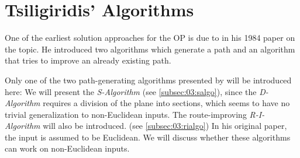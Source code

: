 \section{Tsiligiridis' Algorithms}
\label{sec:03:tsiligiridis}

One of the earliest solution approaches for the OP is due to \citeauthor{tsiligiridis_heuristic_1984} in his 1984 paper on the topic. \cite{tsiligiridis_heuristic_1984}
He introduced two algorithms which generate a path and an algorithm that tries to improve an already existing path.

Only one of the two path-generating algorithms presented by \citeauthor{tsiligiridis_heuristic_1984} will be introduced here:
We will present the \emph{S-Algorithm} (see \cref{subsec:03:salgo}), since the \emph{D-Algorithm} requires a division of the plane into sections, which seems to have no trivial generalization to non-Euclidean inputs.
The route-improving \emph{R-I-Algorithm} will also be introduced. (see \cref{subsec:03:rialgo})
In his original paper, the input is assumed to be Euclidean. 
We will discuss whether these algorithms can work on non-Euclidean inputs.





